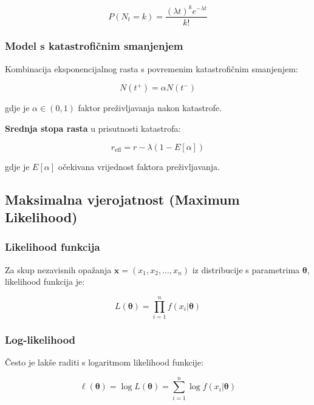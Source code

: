 \documentclass[11pt,oneside]{book}
\begin{document}
\begin{equation}
	P(N_t = k) = \frac{(\lambda t)^k e^{-\lambda t}}{k!}
\end{equation}

\subsubsection{Model s katastrofičnim smanjenjem}

Kombinacija eksponencijalnog rasta s povremenim katastrofičnim smanjenjem:

\begin{equation}
	N(t^+) = \alpha N(t^-)
\end{equation}

gdje je $\alpha \in (0,1)$ faktor preživljavanja nakon katastrofe.

\textbf{Srednja stopa rasta} u prisutnosti katastrofa:

\begin{equation}
	r_{\text{eff}} = r - \lambda(1 - E[\alpha])
\end{equation}

gdje je $E[\alpha]$ očekivana vrijednost faktora preživljavanja.

\subsection{Maksimalna vjerojatnost (Maximum Likelihood)}

\subsubsection{Likelihood funkcija}

Za skup nezavisnih opažanja $\mathbf{x} = (x_1, x_2, \ldots, x_n)$ iz distribucije s parametrima $\boldsymbol{\theta}$, likelihood funkcija je:

\begin{equation}
	L(\boldsymbol{\theta}) = \prod_{i=1}^n f(x_i | \boldsymbol{\theta})
\end{equation}

\subsubsection{Log-likelihood}

Često je lakše raditi s logaritmom likelihood funkcije:

\begin{equation}
	\ell(\boldsymbol{\theta}) = \log L(\boldsymbol{\theta}) = \sum_{i=1}^n \log f(x_i | \boldsymbol{\theta})
\end{equation}
\end{document}
